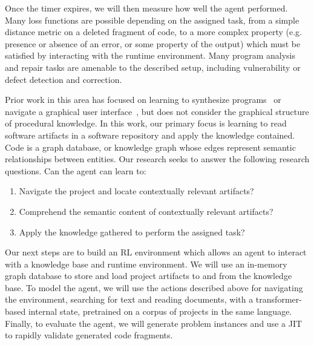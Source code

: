 \documentclass[11pt]{article}
\begin{document}
Once the timer expires, we will then measure how well the agent performed. Many loss functions are possible depending on the assigned task, from a simple distance metric on a deleted fragment of code, to a more complex property (e.g. presence or absence of an error, or some property of the output) which must be satisfied by interacting with the runtime environment. Many program analysis and repair tasks are amenable to the described setup, including vulnerability or defect detection and correction.

Prior work in this area has focused on learning to synthesize programs~\cite{ellis2019write} or navigate a graphical user interface~\cite{considine2019gympc}, but does not consider the graphical structure of procedural knowledge. In this work, our primary focus is learning to read software artifacts in a software repository and apply the knowledge contained. Code is a graph database, or knowledge graph whose edges represent semantic relationships between entities. Our research seeks to answer the following research questions. Can the agent can learn to:

\begin{enumerate}
  \item Navigate the project and locate contextually relevant artifacts?
  \item Comprehend the semantic content of contextually relevant artifacts?
  \item Apply the knowledge gathered to perform the assigned task?
\end{enumerate}

Our next steps are to build an RL environment which allows an agent to interact with a knowledge base and runtime environment. We will use an in-memory graph database to store and load project artifacts to and from the knowledge base. To model the agent, we will use the actions described above for navigating the environment, searching for text and reading documents, with a transformer-based internal state, pretrained on a corpus of projects in the same language. Finally, to evaluate the agent, we will generate problem instances and use a JIT to rapidly validate generated code fragments.

  
  
\end{document}
